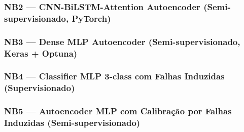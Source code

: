 \documentclass[12pt,a4paper]{article}
\begin{document}

\subsubsection{NB2 --- CNN-BiLSTM-Attention Autoencoder (Semi-supervisionado, PyTorch)}


\subsubsection{NB3 --- Dense MLP Autoencoder (Semi-supervisionado, Keras + Optuna)}


\subsubsection{NB4 --- Classifier MLP 3-class com Falhas Induzidas (Supervisionado)}

\subsubsection{NB5 --- Autoencoder MLP com Calibração por Falhas Induzidas (Semi-supervisionado)}

\end{document}
